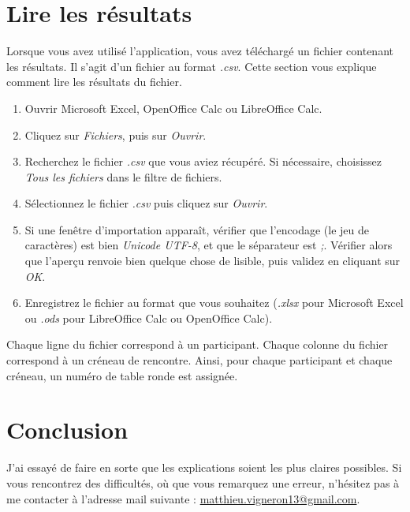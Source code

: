 \documentclass[11pt,a4paper]{article}
\begin{document}
\section{Lire les résultats}
\label{sec:resultats}
Lorsque vous avez utilisé l'application, vous avez téléchargé un fichier contenant les résultats. Il s'agit d'un fichier au format \textit{.csv}. Cette section vous explique comment lire les résultats du fichier.
\begin{enumerate}
  \item Ouvrir Microsoft Excel, OpenOffice Calc ou LibreOffice Calc.
  \item Cliquez sur \textit{Fichiers}, puis sur \textit{Ouvrir}.
  \item Recherchez le fichier \textit{.csv} que vous aviez récupéré. Si nécessaire, choisissez \textit{Tous les fichiers} dans le filtre de fichiers.
  \item Sélectionnez le fichier \textit{.csv} puis cliquez sur \textit{Ouvrir}.
  \item Si une fenêtre d'importation apparaît, vérifier que l'encodage (le jeu de caractères) est bien \textit{Unicode UTF-8}, et que le séparateur est \textit{;}. Vérifier alors que l'aperçu renvoie bien quelque chose de lisible, puis validez en cliquant sur \textit{OK}.
  \item Enregistrez le fichier au format que vous souhaitez (\textit{.xlsx} pour Microsoft Excel ou \textit{.ods} pour LibreOffice Calc ou OpenOffice Calc).
\end{enumerate}
Chaque ligne du fichier correspond à un participant. Chaque colonne du fichier correspond à un créneau de rencontre. Ainsi, pour chaque participant et chaque créneau, un numéro de table ronde est assignée.

\section{Conclusion}
\label{sec:conclusion}
J'ai essayé de faire en sorte que les explications soient les plus claires possibles. Si vous rencontrez des difficultés, où que vous remarquez une erreur, n'hésitez pas à me contacter à l'adresse mail suivante : \href{mailto:matthieu.vigneron13@gmail.com}{matthieu.vigneron13@gmail.com}.
\end{document}
